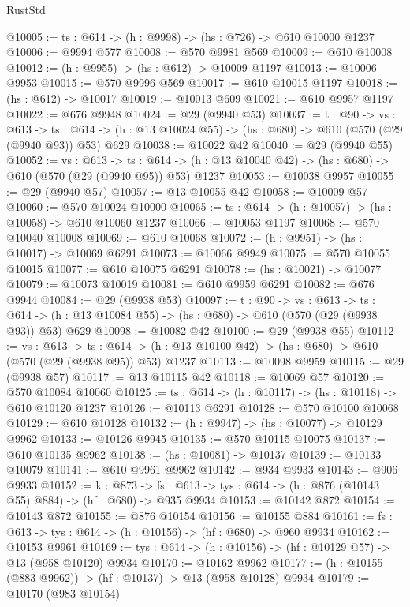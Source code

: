 \begin{lexlean}{RustStd}
\begin{coremodule}
@10005 := {ts : @614} -> (h : @9998) -> (hs : @726) -> @610 @10000 @1237
@10006 := @9994 @577
@10008 := @570 @9981 @569
@10009 := @610 @10008
@10012 := (h : @9955) -> (hs : @612) -> @10009 @1197
@10013 := @10006 @9953
@10015 := @570 @9996 @569
@10017 := @610 @10015 @1197
@10018 := (hs : @612) -> @10017
@10019 := @10013 @609
@10021 := @610 @9957 @1197
@10022 := @676 @9948
@10024 := @29 (@9940 @53)
@10037 := {t : @90} ->
  {vs : @613} ->
  {ts : @614} -> (h : @13 @10024 @55) -> (hs : @680) -> @610 (@570 (@29 (@9940 @93)) @53) @629
@10038 := @10022 @42
@10040 := @29 (@9940 @55)
@10052 := {vs : @613} ->
  {ts : @614} -> (h : @13 @10040 @42) -> (hs : @680) -> @610 (@570 (@29 (@9940 @95)) @53) @1237
@10053 := @10038 @9957
@10055 := @29 (@9940 @57)
@10057 := @13 @10055 @42
@10058 := @10009 @57
@10060 := @570 @10024 @10000
@10065 := {ts : @614} -> (h : @10057) -> (hs : @10058) -> @610 @10060 @1237
@10066 := @10053 @1197
@10068 := @570 @10040 @10008
@10069 := @610 @10068
@10072 := (h : @9951) -> (hs : @10017) -> @10069 @6291
@10073 := @10066 @9949
@10075 := @570 @10055 @10015
@10077 := @610 @10075 @6291
@10078 := (hs : @10021) -> @10077
@10079 := @10073 @10019
@10081 := @610 @9959 @6291
@10082 := @676 @9944
@10084 := @29 (@9938 @53)
@10097 := {t : @90} ->
  {vs : @613} ->
  {ts : @614} -> (h : @13 @10084 @55) -> (hs : @680) -> @610 (@570 (@29 (@9938 @93)) @53) @629
@10098 := @10082 @42
@10100 := @29 (@9938 @55)
@10112 := {vs : @613} ->
  {ts : @614} -> (h : @13 @10100 @42) -> (hs : @680) -> @610 (@570 (@29 (@9938 @95)) @53) @1237
@10113 := @10098 @9959
@10115 := @29 (@9938 @57)
@10117 := @13 @10115 @42
@10118 := @10069 @57
@10120 := @570 @10084 @10060
@10125 := {ts : @614} -> (h : @10117) -> (hs : @10118) -> @610 @10120 @1237
@10126 := @10113 @6291
@10128 := @570 @10100 @10068
@10129 := @610 @10128
@10132 := (h : @9947) -> (hs : @10077) -> @10129 @9962
@10133 := @10126 @9945
@10135 := @570 @10115 @10075
@10137 := @610 @10135 @9962
@10138 := (hs : @10081) -> @10137
@10139 := @10133 @10079
@10141 := @610 @9961 @9962
@10142 := @934 @9933
@10143 := @906 @9933
@10152 := {k : @873} ->
  {fs : @613} -> {tys : @614} -> (h : @876 (@10143 @55) @884) -> (hf : @680) -> @935 @9934
@10153 := @10142 @872
@10154 := @10143 @872
@10155 := @876 @10154
@10156 := @10155 @884
@10161 := {fs : @613} -> {tys : @614} -> (h : @10156) -> (hf : @680) -> @960 @9934
@10162 := @10153 @9961
@10169 := {tys : @614} -> (h : @10156) -> (hf : @10129 @57) -> @13 (@958 @10120) @9934
@10170 := @10162 @9962
@10177 := (h : @10155 (@883 @9962)) -> (hf : @10137) -> @13 (@958 @10128) @9934
@10179 := @10170 (@983 @10154)

\end{coremodule}
\end{lexlean}
